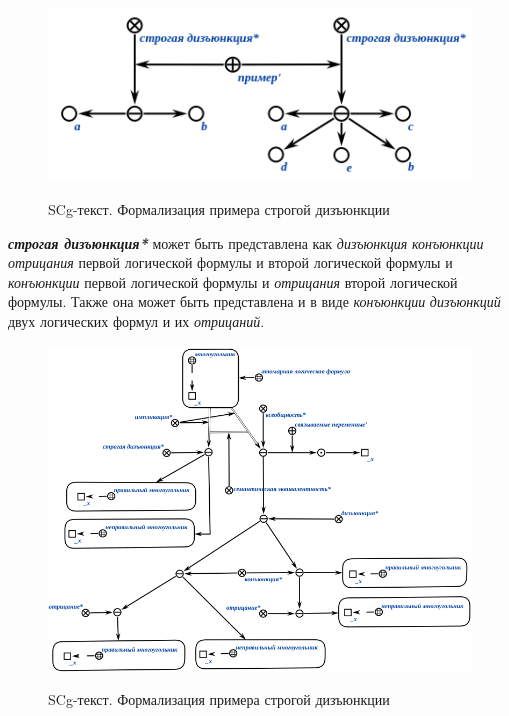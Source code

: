 \begin{figure}[H]
	\caption{SCg-текст. Формализация примера строгой дизъюнкции}
	\includegraphics[scale=0.8]{author/part2/figures/logic/strictDisjunction.png}
	\label{fig:strict_disjunction}
\end{figure}

\textbf{\textit{строгая дизъюнкция*}} может быть представлена как \textit{дизъюнкция} \textit{конъюнкции} \textit{отрицания} первой логической формулы и второй логической формулы и \textit{конъюнкции} первой логической формулы и \textit{отрицания} второй логической формулы. Также она может быть представлена и в виде \textit{конъюнкции} \textit{дизъюнкций} двух логических формул и их \textit{отрицаний}.

\begin{figure}[H]
	\caption{SCg-текст. Формализация примера строгой дизъюнкции}
	\includegraphics[scale=0.8]{author/part2/figures/logic/strict_disjunction_representation.png}
	\label{fig:strict_disjunction_representation}
\end{figure}

\begin{SCn}
\end{SCn}

